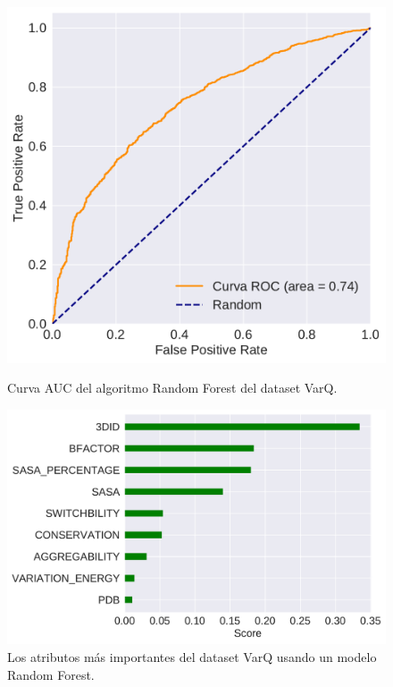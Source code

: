 \begin{figure}
\centering

\begin{minipage}[b]{0.5\textwidth}
    \includegraphics[width=\textwidth]{documents/latex/figures/3/auc_varq.pdf}
    \caption{Curva AUC del algoritmo Random Forest del dataset VarQ.}
    \label{fig:auc_varq}
\end{minipage}

\hfill

\begin{minipage}[b]{0.5\textwidth}
    \includegraphics[width=\textwidth]{documents/latex/figures/3/importances_varq.pdf}
    \caption{Los atributos más importantes del dataset VarQ usando un modelo Random Forest.}
    \label{fig:importance_varq}
\end{minipage}

\end{figure}



